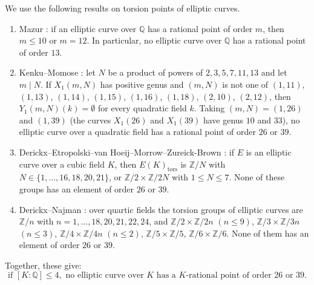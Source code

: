 \documentclass[11pt]{article}
\newcommand{\Q}{\mathbb Q}
\newcommand{\Z}{\mathbb Z}
\begin{document}
We use the following results on torsion points of elliptic curves.
\begin{enumerate}
\item Mazur \cite[Theorem~(7$'$)]{Mazur}: if an elliptic curve over
\(\Q\) has a rational point of order \(m\), then \(m\le10\) or
\(m=12\). In particular, no elliptic curve over \(\Q\) has a rational
point of order \(13\).
\item Kenku--Momose \cite[Theorem~(0.1)]{KM}: let \(N\) be a product of
powers of \(2,3,5,7,11,13\) and let \(m\mid N\). If \(X_1(m,N)\) has
positive genus and \((m,N)\) is not one of \((1,11)\), \((1,13)\),
\((1,14)\), \((1,15)\), \((1,16)\), \((1,18)\), \((2,10)\), \((2,12)\),
then \(Y_1(m,N)(k)=\emptyset\) for every quadratic field \(k\). Taking
\((m,N)=(1,26)\) and \((1,39)\) (the curves \(X_1(26)\) and
\(X_1(39)\) have genus \(10\) and \(33\)), no elliptic curve over a
quadratic field has a rational point of order \(26\) or \(39\).
\item Derickx--Etropolski--van Hoeij--Morrow--Zureick-Brown
\cite[Theorem~A]{DEvHMZB}: if \(E\) is an elliptic curve over a cubic
field \(K\), then \(E(K)_{\mathrm{tors}}\) is \(\Z/N\) with
\(N\in\{1,\ldots,16,18,20,21\}\), or \(\Z/2\times\Z/2N\) with
\(1\le N\le7\). None of these groups has an element of order \(26\) or
\(39\).
\item Derickx--Najman \cite[Theorem~1.1]{DN}: over quartic fields the
torsion groups of elliptic curves are \(\Z/n\) with
\(n=1,\ldots,18,20,21,22,24\), and \(\Z/2\times\Z/2n\) \((n\le9)\),
\(\Z/3\times\Z/3n\) \((n\le3)\), \(\Z/4\times\Z/4n\) \((n\le2)\),
\(\Z/5\times\Z/5\), \(\Z/6\times\Z/6\). None of them has an element of
order \(26\) or \(39\).
\end{enumerate}
Together, these give:
\[
\text{if } [K:\Q]\le 4, \text{ no elliptic curve over } K
\text{ has a } K\text{-rational point of order } 26 \text{ or } 39.
\tag{1.1}
\]
\end{document}
